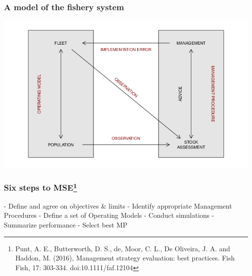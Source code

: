 \documentclass{beamer}\usepackage[]{graphicx}\usepackage[]{xcolor}
\begin{document}
\begin{frame}
\frametitle{A model of the fishery system}

\begin{center}
\includegraphics[height=0.8\textheight]{figs/mse.png}
\end{center}

\end{frame}

\begin{frame}
\frametitle{Six steps to MSE\footnote{Punt, A. E., Butterworth, D. S., de, Moor, C. L., De Oliveira, J. A. and Haddon, M. (2016), Management strategy evaluation: best practices. Fish Fish, 17: 303-334. doi:10.1111/faf.12104}}

- Define and agree on objectives \& limits
- Identify appropriate Management Procedures
- Define a set of Operating Models
- Conduct simulations
- Summarize performance
- Select best MP

\end{frame}
\end{document}

